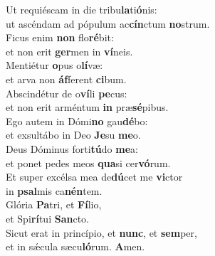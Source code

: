 \evenverse Ut requiéscam in die tribu\textbf{la}ti\textbf{ó}nis:~\*\\
\evenverse ut ascéndam ad pópulum ac\textbf{cín}ctum \textbf{no}strum.\\
\oddverse Ficus enim \textbf{non} flo\textbf{ré}bit:~\*\\
\oddverse et non erit \textbf{ger}men in \textbf{ví}neis.\\
\evenverse Mentiétur \textbf{o}pus o\textbf{lí}væ:~\*\\
\evenverse et arva non \textbf{áf}ferent \textbf{ci}bum.\\
\oddverse Abscindétur de o\textbf{ví}li \textbf{pe}cus:~\*\\
\oddverse et non erit arméntum \textbf{in} præ\textbf{sé}pibus.\\
\evenverse Ego autem in Dómi\textbf{no} gau\textbf{dé}bo:~\*\\
\evenverse et exsultábo in Deo \textbf{Je}su \textbf{me}o.\\
\oddverse Deus Dóminus forti\textbf{tú}do \textbf{me}a:~\*\\
\oddverse et ponet pedes meos \textbf{qua}si cer\textbf{vó}rum.\\
\evenverse Et super excélsa mea de\textbf{dú}cet me \textbf{vi}ctor~\*\\
\evenverse in \textbf{psal}mis ca\textbf{nén}tem.\\
\oddverse Glória \textbf{Pa}tri, et \textbf{Fí}lio,~\*\\
\oddverse et Spi\textbf{rí}tui \textbf{San}cto.\\
\evenverse Sicut erat in princípio, et \textbf{nunc}, et \textbf{sem}per,~\*\\
\evenverse et in sǽcula sæcu\textbf{ló}rum. \textbf{A}men.\\
